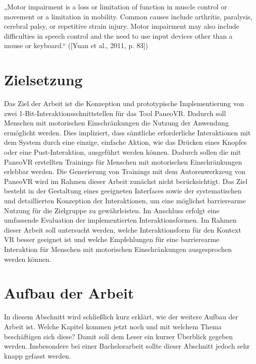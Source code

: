 „Motor impairment is a loss or limitation of function in muscle control or movement or a limitation in mobility. Common causes include arthritis, paralysis, cerebral palsy, or repetitive strain injury. Motor impairment may also include difficulties in speech control and the need to use input devices other than a mouse or keyboard.“ ([Yuan et al., 2011, p. 83])


\section{Zielsetzung}

Das Ziel der Arbeit ist die Konzeption und prototypische Implementierung von zwei 1-Bit-Interaktionsschnittstellen für das Tool PaneoVR. Dadurch soll Menschen mit motorischen Einschränkungen die Nutzung der Anwendung ermöglicht werden. Dies impliziert, dass sämtliche erforderliche Interaktionen mit dem System durch eine einzige, einfache Aktion, wie das Drücken eines Knopfes oder eine Pust-Interaktion, ausgeführt werden können. Dadurch sollen die mit PaneoVR erstellten Trainings für Menschen mit motorischen Einschränkungen erlebbar werden. Die Generierung von Trainings mit dem Autorenwerkzeug von PaneoVR wird im Rahmen dieser Arbeit zunächst nicht berücksichtigt. Das Ziel besteht in der Gestaltung eines geeigneten Interfaces sowie der systematischen und detaillierten Konzeption der Interaktionen, um eine möglichst barrierearme Nutzung für die Zielgruppe zu gewährleisten. Im Anschluss erfolgt eine umfassende Evaluation der implementierten Interaktionsformen. Im Rahmen dieser Arbeit soll untersucht werden, welche Interaktionsform für den Kontext VR besser geeignet ist und welche Empfehlungen für eine barrierearme Interaktion für Menschen mit motorischen Einschränkungen ausgesprochen werden können. 

\section{Aufbau der Arbeit}

In diesem Abschnitt wird schließlich kurz erklärt, wie der weitere Aufbau der Arbeit ist. Welche Kapitel kommen jetzt noch und mit welchem Thema beschäftigen sich diese? Damit soll dem Leser ein kurzer Überblick gegeben werden. Insbesondere bei einer Bachelorarbeit sollte dieser Abschnitt jedoch sehr knapp gefasst werden.
